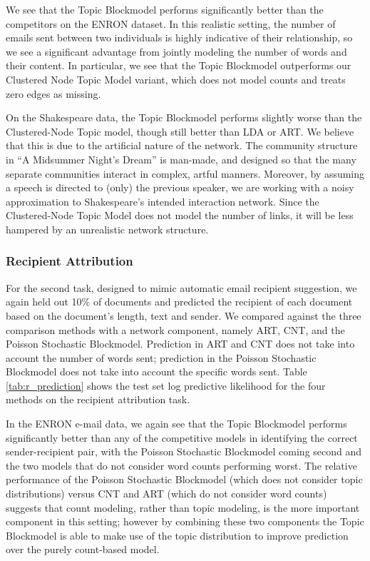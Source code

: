         We see that the Topic Blockmodel performs significantly better than the competitors on the ENRON dataset. In this realistic setting, the number of emails sent between two individuals is highly indicative of their relationship, so we see a significant advantage from jointly modeling the number of words and their content. In particular, we see that the Topic Blockmodel outperforms our Clustered Node Topic Model variant, which does not model counts and treats zero edges as missing.
        
        On the Shakespeare data, the Topic Blockmodel performs slightly worse than the Clustered-Node Topic model, though still better than LDA or ART. We believe that this is due to the artificial nature of the network. The community structure in ``A Midsummer Night's Dream'' is man-made, and designed so that the many separate communities interact in complex, artful manners. Moreover, by assuming a speech is directed to (only) the previous speaker, we are working with a noisy approximation to Shakespeare's intended interaction network.  Since the Clustered-Node Topic Model does not model the number of links, it will be less hampered by an unrealistic network structure. 
        
    \subsubsection{Recipient Attribution}

        For the second task, designed to mimic automatic email recipient suggestion, we again held out 10\% of documents and  predicted the recipient of each document based on the document's length, text and sender. 
        We compared against the three comparison methods with a network component, namely ART, CNT, and the Poisson Stochastic Blockmodel. Prediction in ART and CNT does not take into account the number of words sent; prediction in the Poisson Stochastic Blockmodel does not take into account the specific words sent. Table \ref{tab:r_prediction} shows the test set log predictive likelihood for the four methods on the recipient attribution task.
        
        In the ENRON e-mail data, we again see that the Topic Blockmodel performs significantly better than any of the competitive models in identifying the correct sender-recipient pair, with the Poisson Stochastic Blockmodel coming  second and the two models that do not consider word counts performing worst. The relative performance of the Poisson Stochastic Blockmodel (which does not consider topic distributions) versus CNT and ART (which do not consider word counts) suggests that count modeling, rather than topic modeling, is the more important component in this setting; however by combining these two components the Topic Blockmodel is able to make use of the topic distribution to improve prediction over the purely count-based model.
        
